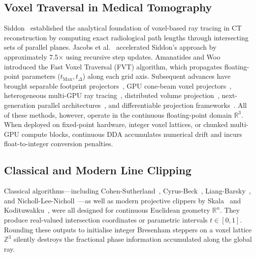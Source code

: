 \documentclass[conference]{IEEEtran}
\begin{document}
\subsection{Voxel Traversal in Medical Tomography}
Siddon~\cite{siddon1985fast} established the analytical foundation of voxel-based ray tracing in CT reconstruction by computing exact radiological path lengths through intersecting sets of parallel planes. Jacobs et al.~\cite{jacobs1998fast} accelerated Siddon's approach by approximately 7.5$\times$ using recursive step updates. Amanatides and Woo~\cite{amanatides1987fast} introduced the Fast Voxel Traversal (FVT) algorithm, which propagates floating-point parameters ($t_{\mathrm{Max}}, t_{\Delta}$) along each grid axis. Subsequent advances have brought separable footprint projectors~\cite{long2010separable}, GPU cone-beam voxel projectors~\cite{li2020gpu,muller2025gecco}, heterogeneous multi-GPU ray tracing~\cite{kim2024heterogeneous}, distributed volume projection~\cite{zhang2023distributed,wang2025distributed}, next-generation parallel architectures~\cite{liu2026ultra}, and differentiable projection frameworks~\cite{song2023differentiable,chen2023exact}. All of these methods, however, operate in the continuous floating-point domain $\mathbb{R}^3$. When deployed on fixed-point hardware, integer voxel lattices, or chunked multi-GPU compute blocks, continuous DDA accumulates numerical drift and incurs float-to-integer conversion penalties.

\subsection{Classical and Modern Line Clipping}
Classical algorithms---including Cohen-Sutherland~\cite{cohen1967clipping,sproull1968clipping}, Cyrus-Beck~\cite{cyrus1978generalized}, Liang-Barsky~\cite{liang1984new}, and Nicholl-Lee-Nicholl~\cite{nicholl1987efficient}---as well as modern projective clippers by Skala~\cite{skala1993algorithm,skala2005homogeneous,skala2021comparison,skala2022survey,skala2024fast,skala2025exact} and Kodituwakku~\cite{kodituwakku2013efficient}, were all designed for continuous Euclidean geometry $\mathbb{R}^n$. They produce real-valued intersection coordinates or parametric intervals $t \in [0, 1]$. Rounding these outputs to initialise integer Bresenham steppers on a voxel lattice $\mathbb{Z}^3$ silently destroys the fractional phase information accumulated along the global ray.
\end{document}
